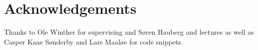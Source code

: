 \section{Acknowledgements}
\label{sec:acknowledgements}

\footnotesize
Thanks to Ole Winther for supervising and Søren Hauberg and lectures as well as Casper Kaae Sønderby and Lars Maaløe for code snippets.
